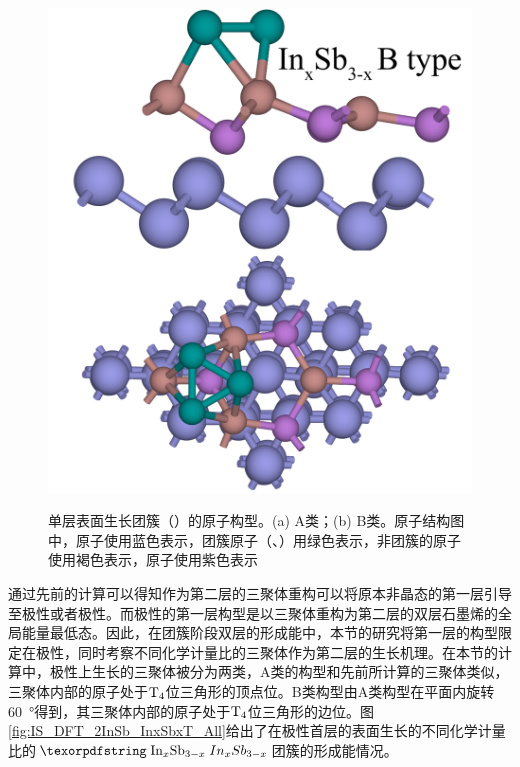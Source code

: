 \begin{figure}[!ht]
{        \includegraphics[scale=0.65]{pic/IS_structure_InxSb3-x_B.png}
    }
    \caption{单层表面生长团簇（）的原子构型。(a) A类；(b) B类。原子结构图中，原子使用蓝色表示，团簇原子（、）用绿色表示，非团簇的原子使用褐色表示，原子使用紫色表示}
    \label{fig:IS_structure_InxSb3-x}
\end{figure} 

通过先前的计算可以得知作为第二层的三聚体重构可以将原本非晶态的第一层引导至极性或者极性。而极性的第一层构型是以三聚体重构为第二层的双层石墨烯的全局能量最低态。因此，在团簇阶段双层的形成能中，本节的研究将第一层的构型限定在极性，同时考察不同化学计量比的三聚体作为第二层的生长机理。在本节的计算中，极性上生长的三聚体被分为两类，A类的构型和先前所计算的三聚体类似，三聚体内部的原子处于$\rm T_{4} \it$位三角形的顶点位。B类构型由A类构型在平面内旋转\SI{60}{\degree}得到，其三聚体内部的原子处于$\rm T_{4} \it$位三角形的边位。图\ref{fig:IS_DFT_2InSb_InxSbxT_All}给出了在极性首层的表面生长的不同化学计量比的$\cemb{In_xSb_{3-x}}$团簇的形成能情况。

